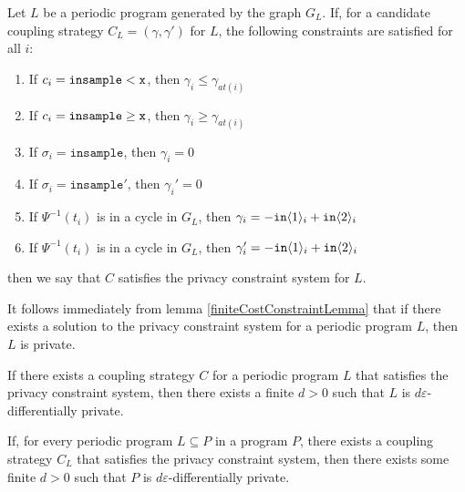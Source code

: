 \begin{defn}\label{privacyConstraintSystem}
    Let $L$ be a periodic program generated by the graph $G_L$. If, for a candidate coupling strategy $C_L = (\gamma, \gamma')$ for $L$, the following constraints are satisfied for all $i$: \begin{enumerate}
        \item If $c_i = \lguard[\texttt{x}]$, then $\gamma_i\leq\gamma_{at(i)}$
        \item If $c_i = \gguard[\texttt{x}]$, then $\gamma_i\geq\gamma_{at(i)}$
        \item If $\sigma_i = \texttt{insample}$, then $\gamma_i=0$
        \item If $\sigma_i = \texttt{insample}'$, then $\gamma_i'=0$
        \item If $\Psi^{-1}(t_i)$ is in a cycle in $G_L$, then $\gamma_i = -\texttt{in}\brangle{1}_i+\texttt{in}\brangle{2}_i$
        \item If $\Psi^{-1}(t_i)$ is in a cycle in $G_L$, then $\gamma_i' = -\texttt{in}\brangle{1}_i+\texttt{in}\brangle{2}_i$
    \end{enumerate}
    then we say that $C$ satisfies the privacy constraint system for $L$. 
\end{defn}

It follows immediately from lemma \ref{finiteCostConstraintLemma} that if there exists a solution to the privacy constraint system for a periodic program $L$, then $L$ is private.

\begin{prop}\label{privacyFiniteCostProp}
    If there exists a coupling strategy $C$ for a periodic program $L$ that satisfies the privacy constraint system, then there exists a finite $d>0$ such that $L$ is $d\varepsilon$-differentially private. 
\end{prop}

\begin{cor}\label{svProgramPrivacyCorollary}
    If, for every periodic program $L\subseteq P$ in a program $P$, there exists a coupling strategy $C_L$ that satisfies the privacy constraint system, then there exists some finite $d>0$ such that $P$ is $d\varepsilon$-differentially private.    
\end{cor}

